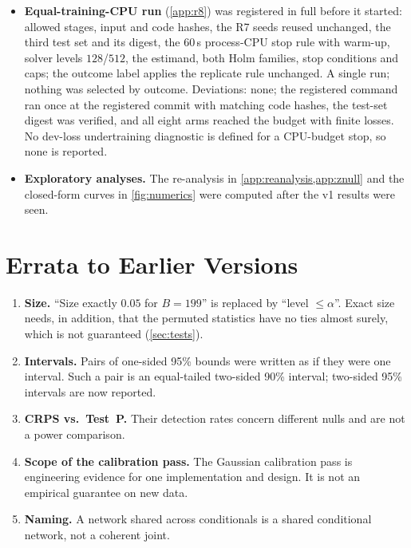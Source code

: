 \documentclass{article}
\theoremstyle{plain}
\theoremstyle{definition}
\theoremstyle{remark}
\begin{document}
\begin{itemize}
\begin{itemize}
  \item Primary null: $R=400$ with a tolerance criterion. The other null cells use Bonferroni excess flags.
  \item Seeds include the test level.
  \item The gate's operating characteristics were computed in advance: P(pass $\mid$ valid, power $0.3$) $=\numOCvThreeGate$.
  \item A timing smoke with a different seed preceded the single run and is not reported.
  \end{itemize}
\item \textbf{Equal-training-CPU run} (\cref{app:r8}) was registered in full before it started: allowed stages, input and code hashes, the R7 seeds reused unchanged, the third test set and its digest, the $60$\,s process-CPU stop rule with warm-up, solver levels $128$/$512$, the estimand, both Holm families, stop conditions and caps; the outcome label applies the replicate rule unchanged. A single run; nothing was selected by outcome. Deviations: none; the registered command ran once at the registered commit with matching code hashes, the test-set digest was verified, and all eight arms reached the budget with finite losses. No dev-loss undertraining diagnostic is defined for a CPU-budget stop, so none is reported.
\item \textbf{Exploratory analyses.} The re-analysis in \cref{app:reanalysis,app:znull} and the closed-form curves in \cref{fig:numerics} were computed after the v1 results were seen.
\end{itemize}

\section{Errata to Earlier Versions}
\label{app:errata}
\begin{enumerate}
\item \textbf{Size.} ``Size exactly $0.05$ for $B=199$'' is replaced by ``level $\le\alpha$''. Exact size needs, in addition, that the permuted statistics have no ties almost surely, which is not guaranteed (\cref{sec:tests}).
\item \textbf{Intervals.} Pairs of one-sided 95\% bounds were written as if they were one interval. Such a pair is an equal-tailed two-sided 90\% interval; two-sided 95\% intervals are now reported.
\item \textbf{CRPS vs.\ Test~P.} Their detection rates concern different nulls and are not a power comparison.
\item \textbf{Scope of the calibration pass.} The Gaussian calibration pass is engineering evidence for one implementation and design. It is not an empirical guarantee on new data.
\item \textbf{Naming.} A network shared across conditionals is a shared conditional network, not a coherent joint.
\end{enumerate}
\end{document}
